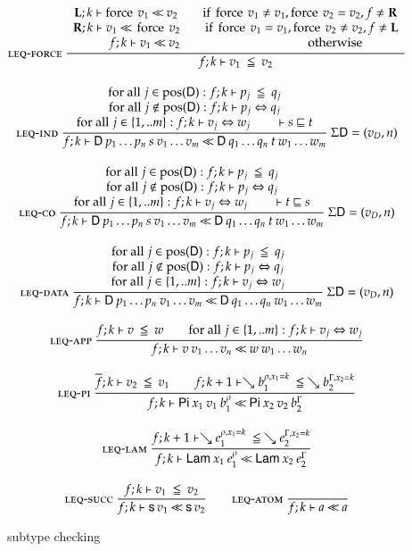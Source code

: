 \begin{figure}[htp]
\begin{gather*}
\mbox{\sc leq-force}\ \dfrac{\begin{array}[b]{c}\mathbf{L};k\vdash\operatorname{force} \: v_1{\:\ll\:}v_2 \qquad \mbox{if } \operatorname{force} \: v_1 \neq v_1 , \operatorname{force} \: v_2 = v_2  , f \neq \mathbf{R}
\\\mathbf{R};k\vdash v_1{\:\ll\:}\operatorname{force} \: v_2 \qquad \mbox{if } \operatorname{force} \: v_1 = v_1 , \operatorname{force} \: v_2 \neq v_2 , f \neq \mathbf{L} \\f;k\vdash v_1{\:\ll\:}v_2 \qquad \qquad \qquad \qquad \qquad \mbox{ otherwise}\end{array}}{f;k\vdash v_1\:\leqq\:v_2}
\\[2ex]
\mbox{\sc leq-ind}\ \dfrac{\begin{array}[b]{c}\mbox{for all } j \in \mbox{pos}(\mathsf{D}): f;k\vdash p_j\:\leqq\:q_j 
\\
\mbox{for all } j \notin \mbox{pos}(\mathsf{D}): f;k\vdash p_j\Leftrightarrow q_j 
\\\mbox{for all } j \in \{1,..m\}: f;k\vdash v_j\Leftrightarrow w_j
\qquad
\vdash s\sqsubseteq t \end{array}}{f;k\vdash\mathsf{D} \: p_1 \ldots p_n \: s \: v_1 \ldots v_m{\:\ll\:}\mathsf{D} \: q_1 \ldots q_n \: t \: w_1 \ldots w_m}
{\: \Sigma \mathsf{D} = (v_D,n)}
\\[2ex]
\mbox{\sc leq-co}\ \dfrac{\begin{array}[b]{c}\mbox{for all } j \in \mbox{pos}(\mathsf{D}): f;k\vdash p_j\:\leqq\:q_j 
\\
\mbox{for all } j \notin \mbox{pos}(\mathsf{D}): f;k\vdash p_j\Leftrightarrow q_j
\\\mbox{for all } j \in \{1,..m\}:f;k\vdash v_j\Leftrightarrow w_j
\qquad
\vdash t\sqsubseteq s \end{array}}{f;k\vdash\mathsf{D} \: p_1 \ldots p_n \: s \: v_1 \ldots v_m{\:\ll\:}\mathsf{D} \: q_1 \ldots q_n \: t \: w_1 \ldots w_m}
{\: \Sigma \mathsf{D} = (v_D,n)} 
\\[2ex]
\mbox{\sc leq-data}\ \dfrac{\begin{array}[b]{c}\mbox{for all } j \in \mbox{pos}(\mathsf{D}): f;k\vdash p_j\:\leqq\:q_j 
\\
\mbox{for all } j \notin \mbox{pos}(\mathsf{D}): f;k\vdash p_j\Leftrightarrow q_j\\\mbox{for all } j \in \{1,..m\}:f;k\vdash v_j\Leftrightarrow w_j\end{array}}{f;k\vdash\mathsf{D} \: p_1 \ldots p_n \: v_1 \ldots v_m{\:\ll\:}\mathsf{D} \: q_1 \ldots q_n \: w_1 \ldots w_m}
{\:\Sigma \mathsf{D} = (v_D,n) }
\\[2ex]
\mbox{\sc leq-app}\ \dfrac{f;k\vdash v\:\leqq\:w \qquad
\mbox{for all } j \in \{1,..m\}:f;k\vdash v_j\Leftrightarrow w_j}{f;k\vdash v \: v_1 \ldots v_n{\:\ll\:}w \: w_1 \ldots w_n}
\\[2ex]
\mbox{\sc leq-pi}\ \dfrac{\overline{f};k\vdash v_2\:\leqq\:v_1
\qquad
f;k+1\vdash\searrow b_1^{\rho,x_1=k}\:\leqq\:\searrow b_2^{\Gamma,x_2=k}}{f;k\vdash\mathsf{Pi} \: x_1 \: v_1 \: b_1^{\rho}{\:\ll\:}\mathsf{Pi} \: x_2 \: v_2 \: b_2^{\Gamma}}
\\[2ex]
\mbox{\sc leq-lam}\ \dfrac{f;k+1\vdash\searrow e_1^{\rho,x_1=k}\:\leqq\:\searrow e_2^{\Gamma,x_2=k}}{f;k\vdash\mathsf{Lam} \: x_1 \: e_1^{\rho}{\:\ll\:}\mathsf{Lam} \: x_2 \: e_2^{\Gamma}}
\\[2ex]
\mbox{\sc leq-succ}\ \dfrac{f;k\vdash v_1\:\leqq\:v_2}{f;k\vdash\mathsf{s}\, v_1{\:\ll\:}\mathsf{s}\, v_2}
\qquad
\mbox{\sc leq-atom}\ \dfrac{}{f;k\vdash a{\:\ll\:}a}
\end{gather*}
\caption{subtype checking}
\label{fsub}
\end{figure}

